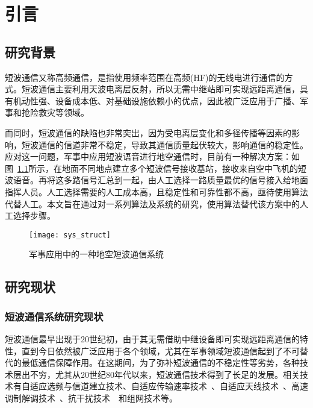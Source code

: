 
\chapter{引言}
\label{chapter:introduction}

\section{研究背景}

短波通信又称高频通信，是指使用频率范围在高频(HF)的无线电进行通信的方式\cite{董彬虹2007短波通信的现状及发展趋势}。短波通信主要利用天波电离层反射，所以无需中继站即可实现远距离通信，具有机动性强、设备成本低、对基础设施依赖小的优点，因此被广泛应用于广播、军事和抢险救灾等领域。

而同时，短波通信的缺陷也非常突出，因为受电离层变化和多径传播等因素的影响，短波通信的信道非常不稳定，导致其通信质量起伏较大，影响通信的稳定性。应对这一问题，军事中应用短波语音进行地空通信时，目前有一种解决方案：如图~\ref{fig:sys_struct}所示，在地面不同地点建立多个短波信号接收基站，接收来自空中飞机的短波语音。再将这多路信号汇总到一起，由人工选择一路质量最优的信号接入给地面指挥人员。人工选择需要的人工成本高，且稳定性和可靠性都不高，亟待使用算法代替人工。本文旨在通过对一系列算法及系统的研究，使用算法替代该方案中的人工选择步骤。

\begin{figure}
\centering
\texttt{[image: sys\_struct]}
\caption{军事应用中的一种地空短波通信系统\label{fig:sys_struct}}
\end{figure}

\section{研究现状}

\subsection{短波通信系统研究现状}

短波通信最早出现于20世纪初，由于其无需借助中继设备即可实现远距离通信的特性，直到今日依然被广泛应用于各个领域，尤其在军事领域短波通信起到了不可替代的最低通信保障作用。在这期间，为了弥补短波通信的不稳定性等劣势，各种技术层出不穷，尤其从20世纪80年代以来，短波通信技术得到了长足的发展。相关技术有自适应选频与信道建立技术、自适应传输速率技术~\cite{clarke2003multilevel}、自适应天线技术~\cite{cook2012adaptive}、高速调制解调技术~\cite{nilsson1997wideband}、抗干扰技术~\cite{andersson1995performance}~\cite{zander1995adaptive}和组网技术等。

